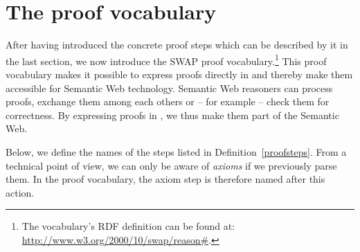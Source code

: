 \section{The proof vocabulary}
After having introduced the concrete proof steps which can be described by it in the last section, we now introduce the SWAP proof vocabulary.\footnote{The vocabulary's RDF definition can be found at: \url{http://www.w3.org/2000/10/swap/reason\#}.}
This proof vocabulary makes it possible 
to express proofs directly in \nthree and thereby make them accessible for Semantic Web technology. Semantic Web reasoners can process proofs, exchange them among each others 
or -- for example -- check them for correctness. By expressing proofs in \nthree, we thus make them part of the Semantic Web.

Below, we define the \nthree names of the steps listed in Definition~\ref{proofsteps}. From a technical point of view, we can only be aware of \emph{axioms} 
if we previously parse them. In the proof vocabulary, the axiom step is therefore named after this action.


